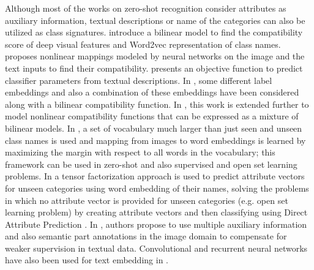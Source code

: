 \documentclass[10pt,twocolumn,letterpaper]{article}
\begin{document}
 Although most of the works on zero-shot recognition consider attributes as auxiliary information,
textual descriptions or name of the categories can also be utilized as class signatures.
 \cite{devise} introduce a bilinear model to find the compatibility score of deep visual features and Word2vec \cite{word2vec} representation of class names.
\cite{ba2015} proposes nonlinear mappings modeled by neural networks on the image and the text inputs to find their compatibility.
\cite{mohamed13} presents an objective function to predict classifier parameters from textual descriptions.
 In \cite{Akata2015}, some different label embeddings and also a combination of these embeddings have been considered along with a bilinear
 compatibility function.
  In \cite{Xian2016}, this work is extended further to model nonlinear compatibility
 functions that can be expressed as a mixture of bilinear models.
In \cite{Fu2016}, a set of vocabulary much larger than just seen and unseen class names is used and mapping from images to word embeddings is learned
by  maximizing the margin with respect to all words in the vocabulary;
 this framework can be used in zero-shot and also supervised and open set learning problems. In \cite{ziad16} a tensor factorization approach is used
 to predict attribute vectors for unseen categories using word embedding of their names, solving the problems in which no
 attribute vector is provided for unseen categories (e.g. open set learning problem) by creating attribute vectors and then classifying using
 Direct Attribute Prediction \cite{lampert09}.
 In  \cite{Akata2016}, authors propose to use multiple auxiliary information and also
 semantic part annotations in the image domain to compensate for weaker supervision in textual data.
Convolutional and recurrent neural networks have also been used for text embedding in \cite{Akata2016rnn}.
\end{document}
